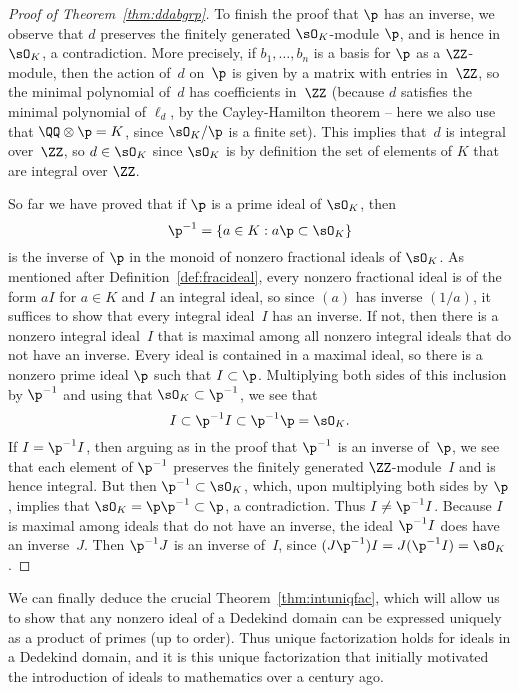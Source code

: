 \begin{proof}[Proof of Theorem~\ref{thm:ddabgrp}]
  To finish the proof that $\p$ has an inverse, we observe that $d$
  preserves the finitely generated $\sO_K$-module $\p$, and is hence in
  $\sO_K$, a contradiction.
  More precisely, if $b_1,\dots, b_n$ is a basis for
  $\p$ as a $\ZZ$-module, then the action of~$d$ on~$\p$ is given by a
  matrix with entries in~$\ZZ$, so the minimal polynomial of~$d$ has
  coefficients in~$\ZZ$ (because $d$ satisfies the minimal polynomial of
  $\ell_d$, by the Cayley-Hamilton theorem -- here we also use that
  $\QQ\otimes\p = K$, since $\sO_K/\p$ is a finite set).  This implies
  that~$d$ is integral over~$\ZZ$, so $d\in \sO_K$ since $\sO_K$ is by
  definition the set of elements of $K$ that are integral over $\ZZ$.

  So far we have proved that if $\p$ is a prime ideal of $\sO_K$, then
  $$
    \p^{-1} = \{a \in K : a\p \subset \sO_K\}
  $$
  is the inverse of $\p$ in
  the monoid of nonzero fractional ideals of $\sO_K$.  As mentioned after
  Definition~\ref{def:fracideal}, every nonzero fractional
  ideal is of the form $aI$ for $a\in K$ and $I$ an integral ideal, so
  since $(a)$ has inverse $(1/a)$, it suffices to show that every
  integral ideal~$I$ has an inverse.  If not, then there is a nonzero
  integral ideal~$I$ that is maximal among all nonzero integral ideals
  that do not have an inverse.  Every ideal is contained in a maximal
  ideal, so there is a nonzero prime ideal $\p$ such that $I\subset \p$.
  Multiplying both sides of this inclusion by $\p^{-1}$ and using that
  $\sO_K\subset \p^{-1}$, we see that
  $$
    I \subset \p^{-1} I \subset \p^{-1}\p = \sO_K.
  $$
  If $I = \p^{-1} I$, then arguing as in the proof that $\p^{-1}$ is an
  inverse of~$\p$, we see that each element of $\p^{-1}$ preserves the
  finitely generated $\ZZ$-module~$I$ and is hence integral.  But then
  $\p^{-1}\subset \sO_K$, which, upon multiplying both sides by $\p$,
  implies that $\sO_K = \p \p^{-1} \subset \p$, a contradiction.
  Thus $I \neq \p^{-1} I$.  Because $I$ is
  maximal among ideals that do not have an inverse, the ideal $\p^{-1}
  I$ does have an inverse~$J$. Then $\p^{-1}J$ is an inverse of~$I$,
  since $(J\p^{-1})I = J(\p^{-1}I) = \sO_K$.
\end{proof}

We can finally deduce the crucial Theorem~\ref{thm:intuniqfac}, which
will allow us to show that any nonzero ideal of a Dedekind domain can
be expressed uniquely as a product of primes (up to order).  Thus
unique factorization holds for ideals in a Dedekind domain, and it is
this unique factorization that initially motivated the introduction of
ideals to mathematics over a century ago.

